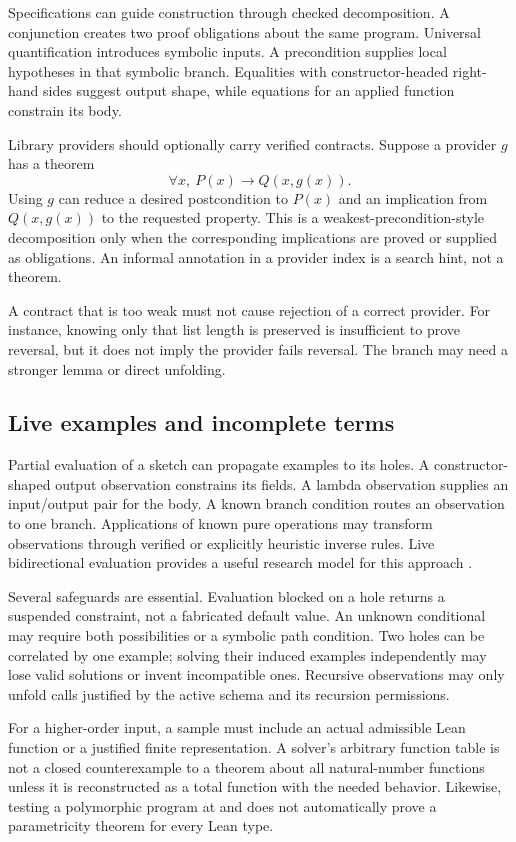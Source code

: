 Specifications can guide construction through checked decomposition. A conjunction creates two proof obligations about the same program. Universal quantification introduces symbolic inputs. A precondition supplies local hypotheses in that symbolic branch. Equalities with constructor-headed right-hand sides suggest output shape, while equations for an applied function constrain its body.

Library providers should optionally carry verified contracts. Suppose a provider $g$ has a theorem
\[
 \forall x,\ P(x)\to Q(x,g(x)).
\]
Using $g$ can reduce a desired postcondition to $P(x)$ and an implication from $Q(x,g(x))$ to the requested property. This is a weakest-precondition-style decomposition only when the corresponding implications are proved or supplied as obligations. An informal annotation in a provider index is a search hint, not a theorem.

A contract that is too weak must not cause rejection of a correct provider. For instance, knowing only that list length is preserved is insufficient to prove reversal, but it does not imply the provider fails reversal. The branch may need a stronger lemma or direct unfolding.

\subsection{Live examples and incomplete terms}

Partial evaluation of a sketch can propagate examples to its holes. A constructor-shaped output observation constrains its fields. A lambda observation supplies an input/output pair for the body. A known branch condition routes an observation to one branch. Applications of known pure operations may transform observations through verified or explicitly heuristic inverse rules. Live bidirectional evaluation provides a useful research model for this approach \cite{lubin,scrybe}.

Several safeguards are essential. Evaluation blocked on a hole returns a suspended constraint, not a fabricated default value. An unknown conditional may require both possibilities or a symbolic path condition. Two holes can be correlated by one example; solving their induced examples independently may lose valid solutions or invent incompatible ones. Recursive observations may only unfold calls justified by the active schema and its recursion permissions.

For a higher-order input, a sample must include an actual admissible Lean function or a justified finite representation. A solver's arbitrary function table is not a closed counterexample to a theorem about all natural-number functions unless it is reconstructed as a total function with the needed behavior. Likewise, testing a polymorphic program at  and  does not automatically prove a parametricity theorem for every Lean type.

